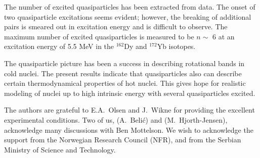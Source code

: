 The number of excited quasiparticles has been extracted from data. The onset of two quasiparticle excitations seems evident; however, the breaking of additional pairs is smeared out in excitation energy and is difficult to observe. The maximum number of excited quasiparticles is measured to be $n \sim$ 6 at an excitation energy of 5.5 MeV in the $^{162}$Dy and $^{172}$Yb isotopes. 

The quasiparticle picture has been a success in describing rotational bands in cold nuclei. The present results indicate that quasiparticles also can describe certain thermodynamical properties of hot nuclei. This gives hope for realistic modeling of nuclei up to high intrinsic energy with several quasiparticles excited.

The authors are grateful to E.A.~Olsen and J.~Wikne for providing the excellent experimental conditions. 
Two of us, (A.~Beli\'c) and (M.~Hjorth-Jensen), acknowledge many discussions with Ben Mottelson. We wish to
acknowledge the support from the Norwegian Research Council (NFR), and from the Serbian Ministry of Science and Technology.

